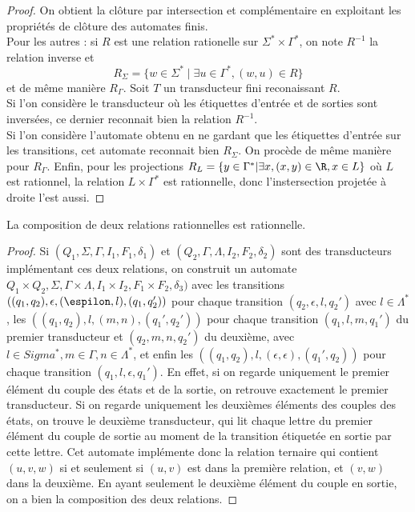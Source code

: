 \documentclass{scrartcl}
\begin{document}
\begin{flushleft}
\begin{proof}
    On obtient la clôture par intersection et complémentaire en exploitant les propriétés de clôture des automates finis.\\
    Pour les autres : si $R$ est une relation rationelle sur $\Sigma^* \times \Gamma^*$, on note $R^{-1}$ la relation inverse et
    \[ R_{\Sigma} = \{ w \in \Sigma^* \mid \exists u \in \Gamma^*, (w, u) \in R \} \]
    et de même manière $R_{\Gamma}$. Soit $T$ un transducteur fini reconaissant $R$.\\
    Si l'on considère le transducteur où les étiquettes d'entrée et de sorties sont inversées, ce dernier reconnait bien la
    relation $R^{-1}$.\\
    Si l'on considère l'automate obtenu en ne gardant que les étiquettes d'entrée sur les transitions, cet automate reconnait bien $R_{\Sigma}$.
    On procède de même manière pour $R_{\Gamma}$.
    Enfin, pour les projections $R_L  = \{ y \in \Gamma^* | \exists x, (x, y) \in \R, x \in L \}$ où $L$ est rationnel, la relation $L \times \Gamma^*$ est rationnelle, donc l'instersection projetée à droite l'est aussi.
\end{proof}

\begin{prop}
    La composition de deux relations rationnelles est rationnelle.
\end{prop}

\begin{proof}
    Si $(Q_1, \Sigma, \Gamma, I_1, F_1, \delta_1)$ et $(Q_2, \Gamma, \Lambda, I_2, F_2, \delta_2)$ sont des transducteurs implémentant ces deux relations, on construit un automate  $Q_1 \times Q_2, \Sigma, \Gamma \times \Lambda, I_1 \times I_2, F_1 \times F_2, \delta_3)$ avec les transitions $((q_1, q_2), \epsilon, (\espilon, l), (q_1, q_2'))$ pour chaque transition $(q_2, \epsilon, l, q_2')$ avec $l \in \Lambda^*$, les $((q_1, q_2), l, (m, n), (q_1', q_2'))$ pour chaque transition $(q_1, l, m, q_1')$ du premier transducteur et $(q_2, m, n, q_2')$ du deuxième, avec $l \in Sigma^*, m \in \Gamma, n \in \Lambda^*$, et enfin les $((q_1, q_2), l, (\epsilon, \epsilon), (q_1', q_2))$ pour chaque transition $(q_1, l, \epsilon, q_1')$. En effet, si on regarde uniquement le premier élément du couple des états et de la sortie, on retrouve exactement le premier transducteur. Si on regarde uniquement les deuxièmes éléments des couples des états, on trouve le deuxième transducteur, qui lit chaque lettre du premier élément du couple de sortie au moment de la transition étiquetée en sortie par cette lettre. Cet automate implémente donc la relation ternaire qui contient $(u, v, w)$ si et seulement si $(u, v)$ est dans la première relation, et $(v, w)$ dans la deuxième. En ayant seulement le deuxième élément du couple en sortie, on a bien la composition des deux relations.
\end{proof}


\end{flushleft}
\end{document}
